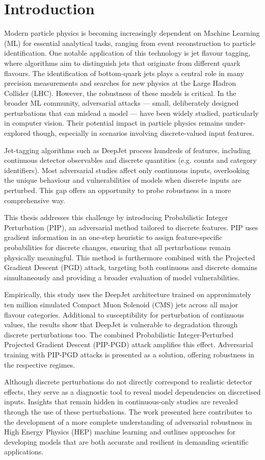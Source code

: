 \chapter{Introduction}

Modern particle physics is becoming increasingly dependent on Machine Learning (ML) for essential analytical tasks, ranging from event reconstruction to particle identification. One notable
application of this technology is jet flavour tagging, where algorithms aim to distinguish jets that originate
from different quark flavours. The identification of bottom-quark jets plays a central role in many precision measurements and searches for new physics at the Large Hadron Collider (LHC). However, the robustness of these models is critical. In the broader ML community, adversarial attacks — small, deliberately designed perturbations that can mislead a model — have been widely studied, particularly in computer vision. Their potential impact in particle physics remains under-explored though, especially in scenarios involving discrete-valued input features.

Jet-tagging algorithms such as DeepJet process hundreds of features, including continuous detector observables and discrete quantities (e.g. counts and category identifiers). Most adversarial studies affect only continuous inputs, overlooking the unique behaviour and vulnerabilities of models when discrete inputs are perturbed. This gap offers an opportunity to probe robustness in a more comprehensive way.

This thesis addresses this challenge by introducing Probabilistic Integer Perturbation (PIP), an adversarial method tailored to discrete features. PIP uses gradient information in an one-step heuristic to assign feature-specific probabilities for discrete changes, ensuring that all perturbations remain physically meaningful. This method is furthermore combined with the Projected Gradient Descent (PGD) attack, targeting both continuous and discrete domains simultaneously and providing a broader evaluation of model vulnerabilities.

Empirically, this study uses the DeepJet architecture trained on approximately ten million simulated Compact Muon Solenoid (CMS) jets across all major flavour categories. Additional to susceptibility for perturbation of continuous values, the results show that DeepJet is vulnerable to degradation through discrete perturbations too. The combined Probabilistic Integer-Perturbed Projected Gradient Descent (PIP-PGD) attack amplifies this effect. Adversarial training with PIP-PGD attacks is presented as a solution, offering robustness in the respective regimes.

Although discrete perturbations do not directly correspond to realistic detector effects, they serve as a diagnostic tool to reveal model dependencies on discretised inputs. Insights that remain hidden in continuous-only studies are revealed through the use of these perturbations. The work presented here contributes to the development of a more complete understanding of adversarial robustness in High Energy Physics (HEP) machine learning and outlines approaches for developing models that are both accurate and resilient in demanding scientific applications.

